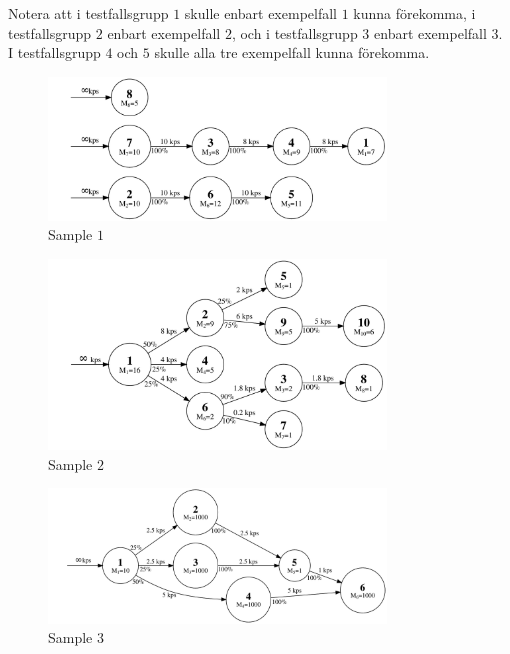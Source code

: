 Notera att i testfallsgrupp $1$ skulle enbart exempelfall $1$ kunna förekomma, i testfallsgrupp $2$ enbart exempelfall $2$, och i testfallsgrupp $3$ enbart exempelfall $3$.
I testfallsgrupp $4$ och $5$ skulle alla tre exempelfall kunna förekomma.
\begin{figure}
	\centering
\includegraphics[width=0.8\textwidth]{sample1}
\caption{Sample $1$}
\end{figure} 
\begin{figure}
	\centering
\includegraphics[width=0.8\textwidth]{sample2}
\caption{Sample $2$}
\end{figure} 
\begin{figure}
	\centering
\includegraphics[width=0.8\textwidth]{sample3}
\caption{Sample $3$}
\end{figure} 
